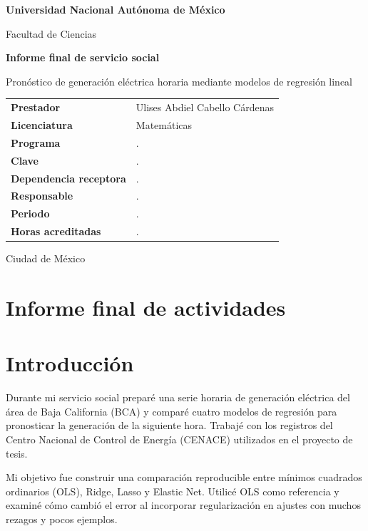 \documentclass[11pt,letterpaper]{article}
\newcommand{\alumno}{Ulises Abdiel Cabello Cárdenas}
\newcommand{\carrera}{Matemáticas}
\newcommand{\programa}{.}
\newcommand{\claveprograma}{.}
\newcommand{\dependencia}{.}
\newcommand{\responsable}{.}
\newcommand{\periodo}{.}
\newcommand{\horas}{.}
\begin{document}
\begin{titlepage}
\centering
{\Large\bfseries Universidad Nacional Autónoma de México\par}
\vspace{0.35cm}
{\large Facultad de Ciencias\par}
\vfill
{\LARGE\bfseries Informe final de servicio social\par}
\vspace{0.6cm}
{\Large Pronóstico de generación eléctrica horaria mediante modelos de regresión lineal\par}
\vfill
\begin{tabular}{@{}lp{}@{}}
\textbf{Prestador} & \alumno \\
\textbf{Licenciatura} & \carrera \\
\textbf{Programa} & \programa \\
\textbf{Clave} & \claveprograma \\
\textbf{Dependencia receptora} & \dependencia \\
\textbf{Responsable} & \responsable \\
\textbf{Periodo} & \periodo \\
\textbf{Horas acreditadas} & \horas \\
\end{tabular}
\vfill
Ciudad de México
\end{titlepage}

\section*{Informe final de actividades}
\section{Introducción}

Durante mi servicio social preparé una serie horaria de generación eléctrica del área de Baja California (BCA) y comparé cuatro modelos de regresión para pronosticar la generación de la siguiente hora. Trabajé con los registros del Centro Nacional de Control de Energía (CENACE) utilizados en el proyecto de tesis.

Mi objetivo fue construir una comparación reproducible entre mínimos cuadrados ordinarios (OLS), Ridge, Lasso y Elastic Net. Utilicé OLS como referencia y examiné cómo cambió el error al incorporar regularización en ajustes con muchos rezagos y pocos ejemplos.
\end{document}
